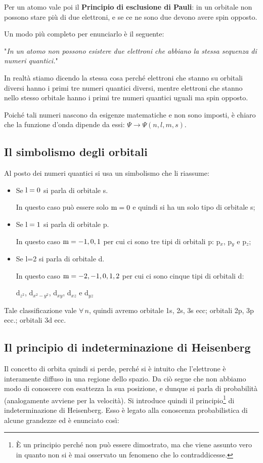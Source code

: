 Per un atomo vale poi il \textbf{Principio di esclusione di Pauli}: in un orbitale non possono stare più di due elettroni, e se ce ne sono due devono avere spin opposto.

Un modo più completo per enunciarlo è il seguente:

\vspace{0.2cm}"\textit{In un atomo non possono esistere due elettroni che abbiano la stessa sequenza di numeri quantici.}"

\vspace{0.2cm}In realtà stiamo dicendo la stessa cosa perché elettroni che stanno su orbitali diversi hanno i primi tre numeri quantici diversi, mentre elettroni che stanno nello stesso orbitale hanno i primi tre numeri quantici uguali ma spin opposto.

\vspace{0.2cm}Poiché tali numeri nascono da esigenze matematiche e non sono imposti, è chiaro che la funzione d'onda dipende da essi: $\Psi\rightarrow\Psi(n,l,m,s)$.

\subsection{Il simbolismo degli orbitali}
Al posto dei numeri quantici si usa un simbolismo che li riassume:
\begin{itemize}
\item Se $\rm l=0$ si parla di orbitale s.

In questo caso può essere solo $\rm m=0$ e quindi si ha un solo tipo di orbitale s;
\item Se $\rm l=1$ si parla di orbitale p.

In questo caso $\rm m=-1, 0, 1$ per cui ci sono tre tipi di orbitali p: p$_x$, p$_y$ e p$_z$;
\item Se l=2 si parla di orbitale d.

In questo caso $\rm m=-2, -1, 0, 1, 2$ per cui ci sono cinque tipi di orbitali d:

d$_{z^2}$, d$_{x^2-y^2}$, d$_{xy}$, d$_{xz}$ e d$_{yz}$
\end{itemize}
Tale classificazione vale $\forall \, n$, quindi avremo orbitale 1s, 2s, 3s ecc; orbitali 2p, 3p ecc.; orbitali 3d ecc. 

\subsection{Il principio di indeterminazione di Heisenberg}
Il concetto di orbita quindi si perde, perché si è intuito che l'elettrone è interamente diffuso in una regione dello spazio. Da ciò segue che non abbiamo modo di conoscere con esattezza la sua posizione, e dunque si parla di probabilità (analogamente avviene per la velocità).
Si introduce quindi il principio\footnote{È un principio perché non può essere dimostrato, ma che viene assunto vero in quanto non si è mai osservato un fenomeno che lo contraddicesse.} di indeterminazione di Heisenberg. Esso è legato alla conoscenza probabilistica di alcune grandezze ed è enunciato così:

